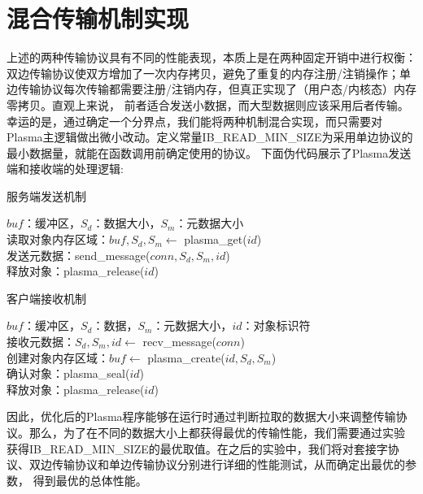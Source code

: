 \section{混合传输机制实现}

上述的两种传输协议具有不同的性能表现，本质上是在两种固定开销中进行权衡：双边传输协议使双方增加了一次内存拷贝，避免了重复的内存注册/注销操作；单边传输协议每次传输都需要注册/注销内存，但真正实现了（用户态/内核态）内存零拷贝。直观上来说，
前者适合发送小数据，而大型数据则应该采用后者传输。幸运的是，通过确定一个分界点，我们能将两种机制混合实现，而只需要对Plasma主逻辑做出微小改动。定义常量IB\_READ\_MIN\_SIZE为采用单边协议的最小数据量，就能在函数调用前确定使用的协议。
下面伪代码展示了Plasma发送端和接收端的处理逻辑:

\begin{algorithm}[h]
	\caption{服务端发送机制}\label{server}
	$buf$：缓冲区，$S_d$：数据大小，$S_m$：元数据大小 \\
	读取对象内存区域：$buf, S_d, S_m \leftarrow$ plasma\_get($id$) \\
	发送元数据：send\_message($conn, S_d, S_m, id$) \\
	释放对象：plasma\_release($id$)
\end{algorithm}

\begin{algorithm}[h]
	\caption{客户端接收机制}\label{client}
	$buf$：缓冲区，$S_d$：数据，$S_m$：元数据大小，$id$：对象标识符 \\
	接收元数据：$S_d, S_m, id \leftarrow$ recv\_message($conn$) \\
	创建对象内存区域：$buf \leftarrow$ plasma\_create($id, S_d, S_m$) \\
	确认对象：plasma\_seal($id$) \\
	释放对象：plasma\_release($id$) \\
\end{algorithm}

因此，优化后的Plasma程序能够在运行时通过判断拉取的数据大小来调整传输协议。那么，为了在不同的数据大小上都获得最优的传输性能，我们需要通过实验
获得IB\_READ\_MIN\_SIZE的最优取值。在之后的实验中，我们将对套接字协议、双边传输协议和单边传输协议分别进行详细的性能测试，从而确定出最优的参数，
得到最优的总体性能。